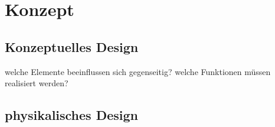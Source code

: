 \chapter{Konzept}
\label{sec:Konzept}

\section{Konzeptuelles Design}
welche Elemente beeinflussen sich gegenseitig?
welche Funktionen müssen realisiert werden?

\section{physikalisches Design}
